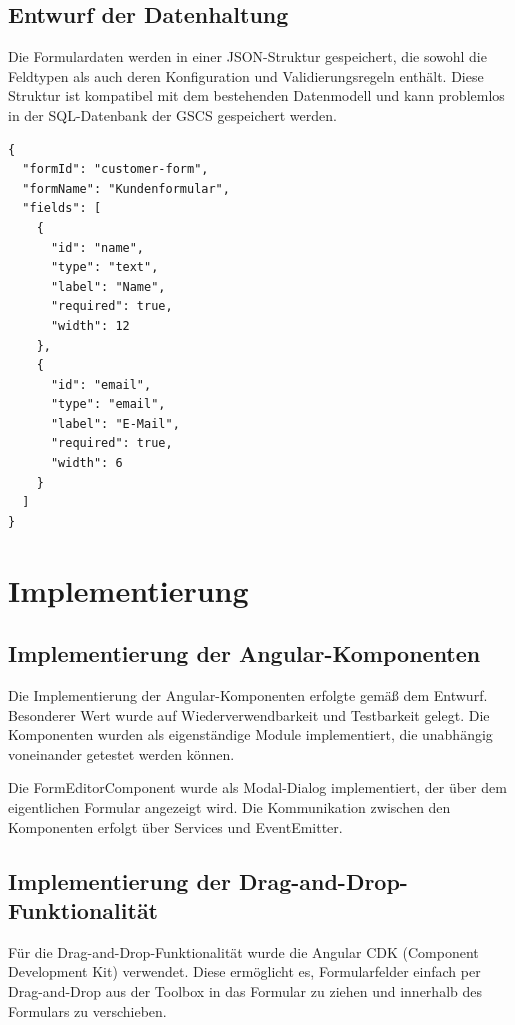 \documentclass[a4paper,11pt]{article}
\begin{document}
\subsection{Entwurf der Datenhaltung}

Die Formulardaten werden in einer JSON-Struktur gespeichert, die sowohl die Feldtypen als auch deren Konfiguration und Validierungsregeln enthält. Diese Struktur ist kompatibel mit dem bestehenden Datenmodell und kann problemlos in der SQL-Datenbank der GSCS gespeichert werden.

\begin{verbatim}
{
  "formId": "customer-form",
  "formName": "Kundenformular",
  "fields": [
    {
      "id": "name",
      "type": "text",
      "label": "Name",
      "required": true,
      "width": 12
    },
    {
      "id": "email",
      "type": "email",
      "label": "E-Mail",
      "required": true,
      "width": 6
    }
  ]
}
\end{verbatim}

\section{Implementierung}

\subsection{Implementierung der Angular-Komponenten}

Die Implementierung der Angular-Komponenten erfolgte gemäß dem Entwurf. Besonderer Wert wurde auf Wiederverwendbarkeit und Testbarkeit gelegt. Die Komponenten wurden als eigenständige Module implementiert, die unabhängig voneinander getestet werden können.

Die FormEditorComponent wurde als Modal-Dialog implementiert, der über dem eigentlichen Formular angezeigt wird. Die Kommunikation zwischen den Komponenten erfolgt über Services und EventEmitter.

\subsection{Implementierung der Drag-and-Drop-Funktionalität}

Für die Drag-and-Drop-Funktionalität wurde die Angular CDK (Component Development Kit) verwendet. Diese ermöglicht es, Formularfelder einfach per Drag-and-Drop aus der Toolbox in das Formular zu ziehen und innerhalb des Formulars zu verschieben.
\end{document}

